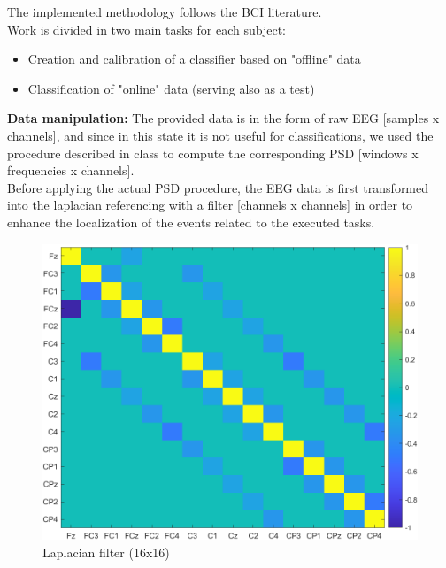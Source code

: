 The implemented methodology follows the BCI literature. \\
Work is divided in two main tasks for each subject: 
\begin{itemize}
\item Creation and calibration of a classifier based on "offline" data
\item Classification of "online" data (serving also as a test)
\end{itemize}\noindent
{\Large \textbf{Data manipulation:}}
The provided data is in the form of raw EEG [samples x channels], and since in this state it is not useful for classifications, we used the procedure described in class to compute the corresponding PSD [windows x frequencies x channels].\\
Before applying the actual PSD procedure, the EEG data is first transformed into the laplacian referencing with a filter [channels x channels] in order to enhance the localization of the events related to the executed tasks.\\

\begin{figure}[h!]
	\begin{center}
		 \includegraphics[width=0.4\linewidth]{img/laplacian_filter.png}
	\end{center}

	 \caption{Laplacian filter (16x16)}
	 \label{fig:laplacian_filter}
\end{figure}

